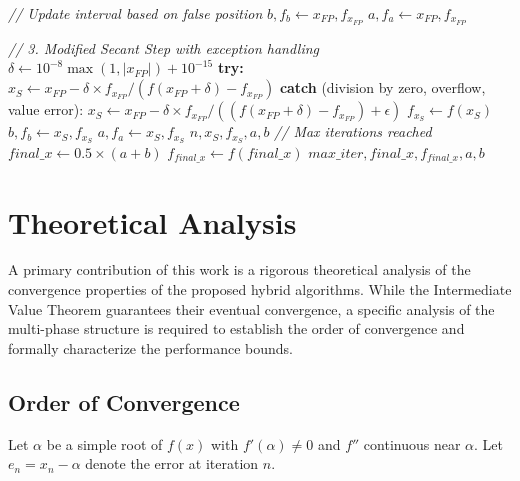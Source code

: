 \documentclass[amsmath, amssymb, aps]{revtex4-2}
\begin{document}
\begin{algorithmic}[1]
        \State \textit{// Update interval based on false position}
            \State $b, f_b \gets x_{FP}, f_{x_{FP}}$
        \Else
            \State $a, f_a \gets x_{FP}, f_{x_{FP}}$
        \EndIf
    
        \State \textit{// 3. Modified Secant Step with exception handling}
        \State $\delta \gets 10^{-8} \max(1, |x_{FP}|) + 10^{-15}$
        \State \textbf{try:}
        \State \quad $x_S \gets x_{FP} - \delta \times f_{x_{FP}} / (f(x_{FP} + \delta) - f_{x_{FP}})$
        \State \textbf{catch} (division by zero, overflow, value error):
        \State \quad $x_S \gets x_{FP} - \delta \times f_{x_{FP}} / ((f(x_{FP} + \delta) - f_{x_{FP}}) + \epsilon)$
            \State $f_{x_S} \gets f(x_S)$
                    \State $b, f_b \gets x_S, f_{x_S}$
                \Else
                    \State $a, f_a \gets x_S, f_{x_S}$
                \EndIf
                    \State \Return $n, x_S, f_{x_S}, a, b$
                \EndIf
            \EndIf
        \EndIf
    \EndFor
    \State \textit{// Max iterations reached}
    \State $final\_x \gets 0.5 \times (a + b)$
    \State $f_{final\_x} \gets f(final\_x)$
    \State \Return $max\_iter, final\_x, f_{final\_x}, a, b$
    \end{algorithmic}

\setlength{\parskip}{1.5ex plus 0.5ex minus 0.2ex}
\section{Theoretical Analysis}\label{sec:theoretical_analysis}

A primary contribution of this work is a rigorous theoretical analysis of the convergence properties of the proposed hybrid algorithms. While the Intermediate Value Theorem guarantees their eventual convergence, a specific analysis of the multi-phase structure is required to establish the order of convergence and formally characterize the performance bounds.

\subsection{Order of Convergence}

Let $\alpha$ be a simple root of $f(x)$ with $f'(\alpha) \neq 0$ and $f''$ continuous near $\alpha$. Let $e_n = x_n - \alpha$ denote the error at iteration $n$.
\end{document}
